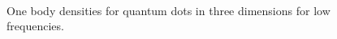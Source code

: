 \begin{figure}
\begin{center}
     \\
  \caption{One body densities for quantum dots in three dimensions for low frequencies.}
  \label{fig:OBD_QDOTS3D_lowfreq}
 \end{center}
\end{figure}

\clearpage

\clearpage

